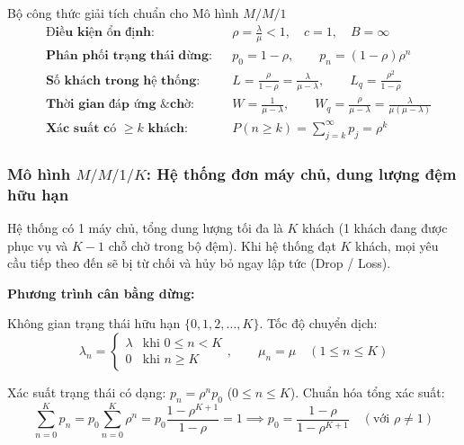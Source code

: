 \begin{modelbox}{Bộ công thức giải tích chuẩn cho Mô hình $M/M/1$}
\begin{align*}
    &\textbf{Điều kiện ổn định:} && \rho = \frac{\lambda}{\mu} < 1, \quad c = 1, \quad B = \infty \\[4pt]
    &\textbf{Phân phối trạng thái dừng:} && p_0 = 1 - \rho, \qquad p_n = (1 - \rho)\rho^n \\[4pt]
    &\textbf{Số khách trong hệ thống:} && L = \frac{\rho}{1 - \rho} = \frac{\lambda}{\mu - \lambda}, \qquad L_q = \frac{\rho^2}{1 - \rho} \\[4pt]
    &\textbf{Thời gian đáp ứng \& chờ:} && W = \frac{1}{\mu - \lambda}, \qquad W_q = \frac{\rho}{\mu - \lambda} = \frac{\lambda}{\mu(\mu - \lambda)} \\[4pt]
    &\textbf{Xác suất có $\ge k$ khách:} && P(n \ge k) = \sum_{j=k}^\infty p_j = \rho^k
\end{align*}
\end{modelbox}

\subsubsection{Mô hình \texorpdfstring{$M/M/1/K$}{M/M/1/K}: Hệ thống đơn máy chủ, dung lượng đệm hữu hạn}

\hspace{0.5cm}Hệ thống có 1 máy chủ, tổng dung lượng tối đa là $K$ khách (1 khách đang được phục vụ và $K-1$ chỗ chờ trong bộ đệm). Khi hệ thống đạt $K$ khách, mọi yêu cầu tiếp theo đến sẽ bị từ chối và hủy bỏ ngay lập tức (Drop / Loss).

\textbf{Phương trình cân bằng dừng:}

Không gian trạng thái hữu hạn $\{0, 1, 2, \dots, K\}$. Tốc độ chuyển dịch:
\begin{equation}
    \lambda_n = \begin{cases} \lambda & \text{khi } 0 \le n < K \\ 0 & \text{khi } n \ge K \end{cases}, \qquad \mu_n = \mu \quad (1 \le n \le K)
\end{equation}

Xác suất trạng thái có dạng: $p_n = \rho^n p_0$ ($0 \le n \le K$). Chuẩn hóa tổng xác suất:
\begin{equation}
    \sum_{n=0}^K p_n = p_0 \sum_{n=0}^K \rho^n = p_0 \frac{1 - \rho^{K+1}}{1 - \rho} = 1 \implies p_0 = \frac{1 - \rho}{1 - \rho^{K+1}} \quad (\text{với } \rho \neq 1)
\end{equation}

